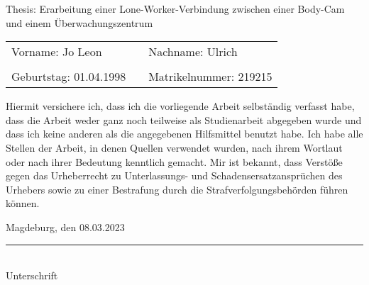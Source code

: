 \documentclass[thesis.tex]{subfiles}
\begin{document}


Thesis: Erarbeitung einer Lone-Worker-Verbindung zwischen einer Body-Cam und einem Überwachungszentrum

\vspace{20pt}

\begin{tabular}[h]{lll}
  Vorname: Jo Leon &  & Nachname: Ulrich \\
  \\
  Geburtstag: 01.04.1998 &  & Matrikelnummer: 219215 \\
\end{tabular}

\vspace{20pt}

Hiermit versichere ich, dass ich die vorliegende Arbeit selbständig verfasst habe, dass die Arbeit weder ganz noch teilweise als Studienarbeit abgegeben wurde und dass ich keine anderen als die angegebenen Hilfsmittel benutzt habe.
Ich habe alle Stellen der Arbeit, in denen Quellen verwendet wurden, nach ihrem Wortlaut oder nach ihrer Bedeutung kenntlich gemacht.
Mir ist bekannt, dass Verstöße gegen das Urheberrecht zu Unterlassungs- und Schadensersatzansprüchen des Urhebers sowie zu einer Bestrafung durch die Strafverfolgungsbehörden führen können.

\vspace{20pt}

Magdeburg, den 08.03.2023
\vspace{50pt}

\noindent\rule[1ex]{0.4\textwidth}{1pt}\\
Unterschrift



\vspace{100pt}


\newpage
\end{document}

